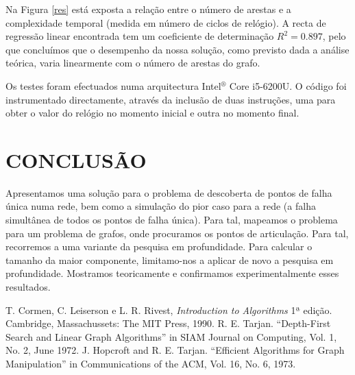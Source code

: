 \documentclass[a4paper, 12pt, conference, portuguese]{ieeeconf}
\begin{document}
Na Figura \ref{res} está exposta a relação entre o número de arestas e a
complexidade temporal (medida em número de ciclos de relógio). A recta de
regressão linear encontrada tem um coeficiente de determinação $R^2 = 0.897$,
pelo que concluímos que o desempenho da nossa solução,  como previsto dada a
análise teórica, varia linearmente com o número de arestas do grafo.

Os testes foram efectuados numa arquitectura Intel$^\circledR$ Core\texttrademark
i5-6200U. O código foi instrumentado directamente, através da inclusão de duas
instruções, uma para obter o valor do relógio no momento inicial e outra no
momento final.

\section{CONCLUSÃO}\label{conclusion}

Apresentamos uma solução para o problema de descoberta de pontos de falha única
numa rede, bem como a simulação do pior caso para a rede (a falha simultânea de
todos os pontos de falha única). Para tal, mapeamos o problema para um problema
de grafos, onde procuramos os pontos de articulação. Para tal, recorremos a uma variante da
pesquisa em profundidade. Para calcular o tamanho da maior componente,
limitamo-nos a aplicar de novo a pesquisa em profundidade. Mostramos
teoricamente e confirmamos experimentalmente esses resultados.

\begin{thebibliography}{99}
   T. Cormen, C. Leiserson e L. R. Rivest, \textit{Introduction
    to Algorithms} 1ª edição. Cambridge, Massachussets: The MIT Press,
    1990.
   R. E. Tarjan. ``Depth-First Search and Linear Graph
    Algorithms'' in SIAM Journal on Computing, Vol. 1, No. 2, June 1972.
   J. Hopcroft and R. E. Tarjan. ``Efficient Algorithms for
    Graph Manipulation'' in Communications of the ACM, Vol. 16, No. 6, 1973.
\end{thebibliography}
\end{document}
